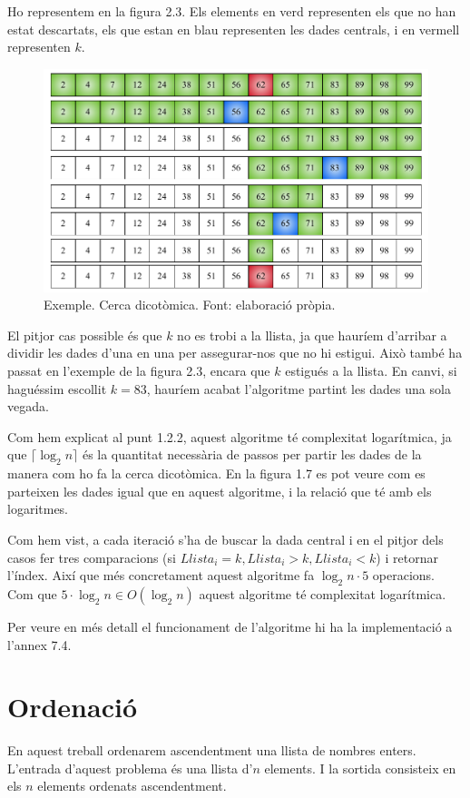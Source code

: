 Ho representem en la figura 2.3. Els elements en verd representen els que no han estat descartats, els que estan en blau representen les dades centrals, i en vermell representen $k$.
\begin{figure}[H]
    \centering
    \includegraphics[width=.7\textwidth]{capitols/figures/binary2.pdf}
    \caption[Exemple. Cerca dicotòmica.]{Exemple. Cerca dicotòmica. Font: elaboració pròpia.}
    \label{fig:my_label}
\end{figure}
\vspace{-18pt}

El pitjor cas possible és que $k$ no es trobi a la llista, ja que hauríem d'arribar a dividir les dades d'una en una per assegurar-nos que no hi estigui. Això també ha passat en l'exemple de la figura 2.3, encara que $k$ estigués a la llista. En canvi, si haguéssim escollit $k = 83$, hauríem acabat l'algoritme partint les dades una sola vegada.

Com hem explicat al punt 1.2.2, aquest algoritme té complexitat logarítmica, ja que $\lceil\log_2{n}\rceil$ és la quantitat necessària de passos per partir les dades de la manera com ho fa la cerca dicotòmica. En la figura 1.7 es pot veure com es parteixen les dades igual que en aquest algoritme, i la relació que té amb els logaritmes.

Com hem vist, a cada iteració s'ha de buscar la dada central i en el pitjor dels casos fer tres comparacions (si $Llista_i = k, Llista_i > k, Llista_i < k$) i retornar l'índex. Així que més concretament aquest algoritme fa $\log_2{n} \cdot 5$ operacions. Com que $5 \cdot \log_2{n} \in O(\log_2{n})$ aquest algoritme té complexitat logarítmica.

Per veure en més detall el funcionament de l'algoritme hi ha la implementació a l'annex 7.4.

\section{Ordenació}
En aquest treball ordenarem ascendentment una llista de nombres enters. L'entrada d'aquest problema és una llista d'$n$ elements. I la sortida consisteix en els $n$ elements ordenats ascendentment.

